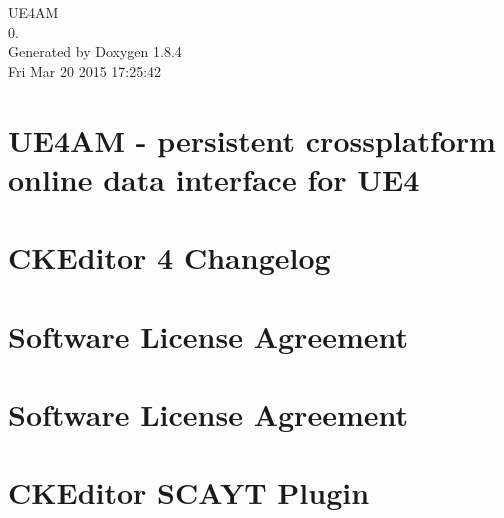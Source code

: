 \documentclass[twoside]{book}
\newcommand{\clearemptydoublepage}{%
  \newpage{\pagestyle{empty}\cleardoublepage}%
}
\begin{document}
\hypersetup{pageanchor=false}
\begin{titlepage}
\vspace*{7cm}
\begin{center}%
{\Large U\-E4\-A\-M \\[1ex]\large 0. }\\
\vspace*{1cm}
{\large Generated by Doxygen 1.8.4}\\
\vspace*{0.5cm}
{\small Fri Mar 20 2015 17:25:42}\\
\end{center}
\end{titlepage}
\clearemptydoublepage
\tableofcontents
\clearemptydoublepage
{}
\hypersetup{pageanchor=true}

\chapter{U\-E4\-A\-M -\/ persistent crossplatform online data interface for U\-E4}
\label{index}\hypertarget{index}{}
\chapter{C\-K\-Editor 4 Changelog}
\label{md_admin_js_plugins_ckeditor_CHANGES}
\hypertarget{md_admin_js_plugins_ckeditor_CHANGES}{}

\chapter{Software License Agreement}
\label{md_admin_js_plugins_ckeditor_LICENSE}
\hypertarget{md_admin_js_plugins_ckeditor_LICENSE}{}

\chapter{Software License Agreement}
\label{md_admin_js_plugins_ckeditor_plugins_scayt_LICENSE}
\hypertarget{md_admin_js_plugins_ckeditor_plugins_scayt_LICENSE}{}

\chapter{C\-K\-Editor S\-C\-A\-Y\-T Plugin}
\label{md_admin_js_plugins_ckeditor_plugins_scayt_README}
\hypertarget{md_admin_js_plugins_ckeditor_plugins_scayt_README}{}

\end{document}
